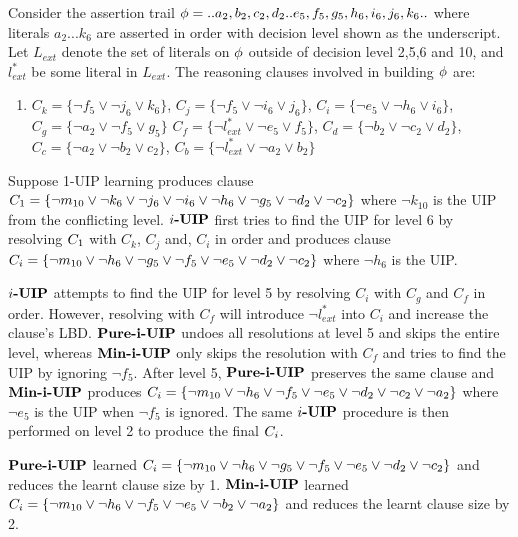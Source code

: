 \documentclass[runningheads]{llncs}
\begin{document}
\begin{example}
    Consider the assertion trail
    $\phi =
    {..a_2,b_2,c_2,d_2..e_5,f_5,g_5,h_6,i_6,j_6,k_6..}$ where literals
    $a_2 ... k_{6}$ are asserted in order with decision level shown as
    the underscript. Let $L_{ext}$ denote the set of literals on
    $\phi$ outside of decision level 2,5,6 and 10, and
    $l^{*}_{ext}$ be some literal in $L_{ext}$. The reasoning clauses
    involved in building $\phi$ are:
\begin{enumerate}
  \item[] $C_k = \{\neg{f_5} \vee \neg{j_6} \vee k_6\}$,
  $C_j = \{\neg{f_5} \vee \neg{i_6} \vee j_6\}$, 
  $C_i = \{\neg{e_5} \vee \neg{h_6} \vee i_6\}$,
  $C_g = \{\neg{a_2} \vee \neg{f_5} \vee g_5\}$
  $C_f = \{\neg{l^{*}_{ext}} \vee \neg{e_5} \vee f_5\}$,
  $C_d = \{\neg{b_2} \vee \neg{c_2} \vee d_2\}$,
  $C_c = \{\neg{a_2} \vee \neg{b_2} \vee c_2 \}$,
  $C_b = \{\neg{l^{*}_{ext}} \vee \neg{a_2} \vee b_2\}$
\end{enumerate}
Suppose 1-UIP learning produces clause
$C_{1} = \{\neg{m_{10}} \vee \neg{k_6} \vee \neg{j_6} \vee
\neg{i_6} \vee \neg{h_6} \vee \neg{g_5} \vee \neg{d_2} \vee
\neg{c_2}\}$ where $\neg{k_{10}}$ is the UIP from the conflicting
level. $\textbf{$i$-UIP}$ first tries to find the UIP for level 6 by resolving
$C_{1}$ with $C_k$, $C_j$ and, $C_i$ in order and produces
clause
$C_{i} = \{\neg{m_{10}} \vee \neg{h_6} \vee \neg{g_5} \vee
\neg{f_5} \vee \neg{e_5} \vee \neg{d_2} \vee \neg{c_2} \}$ where
$\neg{h_6}$ is the UIP.

$\textbf{$i$-UIP}$ attempts to find the UIP for level 5 by resolving $C_i$ with
$C_g$ and $C_f$ in order. However, resolving with $C_f$ will introduce
$\neg{l^{*}_{ext}}$ into $C_i$ and increase the clause's
LBD. $\textbf{Pure-i-UIP}$ undoes all resolutions at level 5 and skips the
entire level, whereas $\textbf{Min-i-UIP}$ only skips the resolution with $C_f$
and tries to find the UIP by ignoring $\neg{f_5}$.  After level 5,
$\textbf{Pure-i-UIP}$ preserves the same clause and $\textbf{Min-i-UIP}$ produces
$C_{i} = \{\neg{m_{10}} \vee \neg{h_6} \vee \neg{f_5} \vee
\neg{e_5} \vee \neg{d_2} \vee \neg{c_2} \vee \neg{a_2}\}$ where
$\neg{e_5}$ is the UIP when $\neg{f_5}$ is ignored. The same $\textbf{$i$-UIP}$
procedure is then performed on level 2 to produce the final
$C_{i}$.

$\textbf{Pure-i-UIP}$ learned
$C_{i} = \{\neg{m_{10}} \vee \neg{h_6} \vee \neg{g_5} \vee
\neg{f_5} \vee \neg{e_5} \vee \neg{d_2} \vee \neg{c_2} \}$ and reduces
the learnt clause size by 1. $\textbf{Min-i-UIP}$ learned
$C_{i} = \{\neg{m_{10}} \vee \neg{h_6} \vee \neg{f_5} \vee
\neg{e_5} \vee \neg{b_2} \vee \neg{a_2}\}$ and reduces the learnt
clause size by 2.
\end{example}
\end{document}
